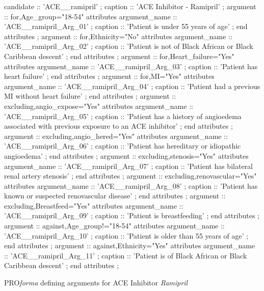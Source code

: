 \documentclass[11pt]{article}
\begin{document}
\begin{code}[ht]
\begin{html}
candidate :: 'ACE__ramipril' ;
          caption :: 'ACE Inhibitor - Ramipril' ;
          argument :: for,Age_group="18-54"            attributes
               argument_name :: 'ACE__ramipril_Arg_01' ;
               caption :: 'Patient is under 55 years of age' ;
          end attributes
          ;
          argument :: for,Ethnicity="No"            attributes
               argument_name :: 'ACE__ramipril_Arg_02' ;
               caption :: 'Patient is not of Black African or Black Caribbean descent' ;
          end attributes
          ;
          argument :: for,Heart_failure="Yes"            attributes
               argument_name :: 'ACE__ramipril_Arg_03' ;
               caption :: 'Patient has heart failure' ;
          end attributes
          ;
          argument :: for,MI="Yes"            attributes
               argument_name :: 'ACE__ramipril_Arg_04' ;
               caption :: 'Patient had a previous MI without heart failure' ;
          end attributes
          ;
          argument :: excluding,angio_expose="Yes"            attributes
               argument_name :: 'ACE__ramipril_Arg_05' ;
               caption :: 'Patient has a history of angioedema associated with previous exposure to an ACE inhibitor' ;
          end attributes
          ;
          argument :: excluding,angio_hered="Yes"            attributes
               argument_name :: 'ACE__ramipril_Arg_06' ;
               caption :: 'Patient has hereditary or idiopathic angioedema' ;
          end attributes
          ;
          argument :: excluding,stenosis="Yes"            attributes
               argument_name :: 'ACE__ramipril_Arg_07' ;
               caption :: 'Patient has bilateral renal artery stenosis' ;
          end attributes
          ;
          argument :: excluding,renovascular="Yes"            attributes
               argument_name :: 'ACE__ramipril_Arg_08' ;
               caption :: 'Patient has known or suspected renovascular disease' ;
          end attributes
          ;
          argument :: excluding,Breastfeed="Yes"            attributes
               argument_name :: 'ACE__ramipril_Arg_09' ;
               caption :: 'Patient is breastfeeding' ;
          end attributes
          ;
          argument :: against,Age_group!="18-54"    attributes
               argument_name :: 'ACE__ramipril_Arg_10' ;
               caption :: 'Patient is older than 55 years of age' ;
          end attributes
          ;
          argument :: against,Ethnicity="Yes"    attributes
               argument_name :: 'ACE__ramipril_Arg_11' ;
               caption :: 'Patient is of Black African or Black Caribbean descent' ;
          end attributes
          ;
\end{html}
\label{code:ramipril}
\caption{PRO\textit{forma} defining arguments for ACE Inhibitor \textit{Ramipril}}
\end{code}
\end{document}
